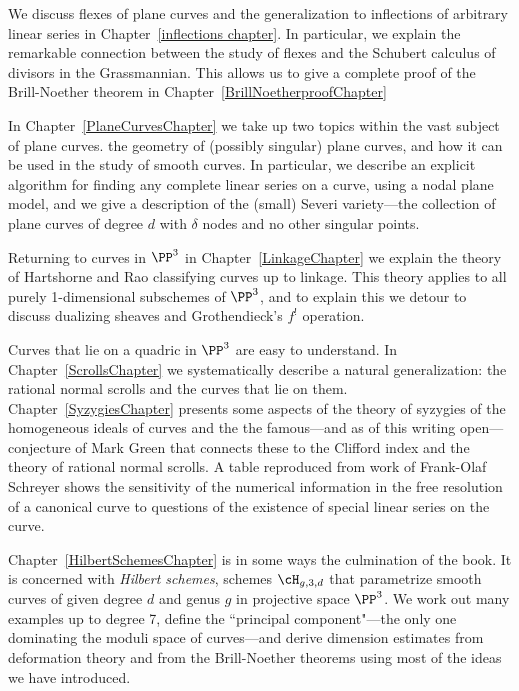 We discuss flexes of plane curves and the 
generalization to inflections of arbitrary linear series in Chapter~\ref{inflections chapter}. In particular, we explain
the remarkable connection between the study of flexes and the Schubert calculus of divisors in the Grassmannian.
This allows us to give a complete proof of the Brill-Noether theorem in Chapter~\ref{BrillNoetherproofChapter} 

In Chapter~\ref{PlaneCurvesChapter} we take up two topics within the vast subject  of plane curves. the geometry of (possibly singular) plane curves, and how it can be used in the study of smooth curves. In particular, we describe an explicit algorithm for finding any complete linear series on a curve, using a nodal plane model, and we give a description of the 
(small) Severi variety---the collection of plane curves of degree $d$ with $\delta$ nodes and no other singular points.

Returning to curves in $\PP^{3}$ in Chapter~\ref{LinkageChapter} we explain the theory of Hartshorne and Rao classifying curves up to linkage. This theory applies to all purely 1-dimensional subschemes of $\PP^{3}$, and to explain this
we detour to discuss dualizing sheaves and Grothendieck's $f^{!}$ operation.

Curves that lie on a quadric in $\PP^3$ are easy to understand. In Chapter~\ref{ScrollsChapter} we systematically describe a natural generalization: the rational normal scrolls and the curves that lie on them. Chapter~\ref{SyzygiesChapter} presents some aspects of the theory of syzygies of the homogeneous ideals of curves and the the famous---and as of this writing open---conjecture of Mark Green that connects these to the Clifford index and the theory of rational normal scrolls. A table reproduced from work of Frank-Olaf Schreyer shows the sensitivity of the numerical information in the free resolution of a canonical curve to questions of the existence of special linear series on the curve.

Chapter~\ref{HilbertSchemesChapter} is in some ways the culmination of the book. It is concerned with \emph{Hilbert schemes}, schemes $\cH_{g,3,d}$ that parametrize smooth curves of given degree $d$ and genus $g$ in projective space $\PP^3$. We work out many examples up to degree 7, define the ``principal component"---the only one dominating the moduli space of curves---and derive dimension estimates from deformation theory and from the Brill-Noether theorems
using most of the ideas we have introduced.

